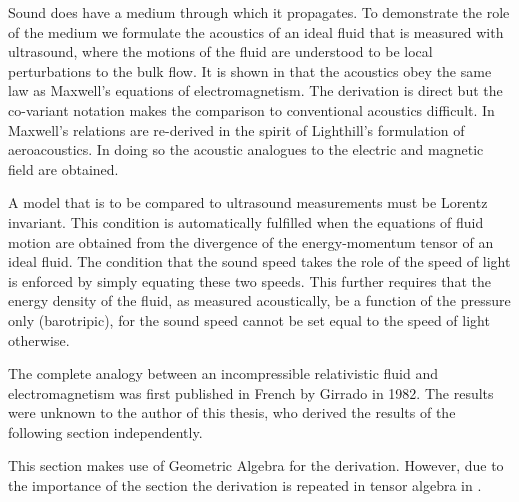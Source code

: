 Sound does have a medium through which it propagates.
To demonstrate the role of the medium we formulate the acoustics of  an ideal fluid that is measured with ultrasound,
where the motions of the fluid are  understood to be local perturbations to the bulk flow.
It is shown in  that the acoustics  obey the same law as Maxwell's equations of electromagnetism.
The derivation is direct but the co-variant notation makes the comparison to conventional acoustics difficult.
In  Maxwell's relations are re-derived in the spirit of Lighthill's formulation of aeroacoustics.
In doing so the acoustic analogues to the electric and magnetic field are obtained.

%
A model that is to be compared to ultrasound measurements must be  Lorentz invariant.
This condition is  automatically fulfilled  when the equations of fluid motion are obtained from the  divergence of the energy-momentum tensor of an ideal fluid.
The condition that the sound speed takes the role  of the speed of light
is enforced by simply equating these two speeds.
This further requires that the energy density of the fluid, as measured acoustically, be a function of the pressure only (barotripic),
for the sound speed cannot be set equal to the speed of light otherwise\cite{Taub1978}.

The complete analogy between an incompressible relativistic fluid and electromagnetism was first published in French by Girrado\cite{Girrado1982} in 1982.
The results were unknown to the author of this thesis, who derived the results of the following section independently.

This section makes use of Geometric Algebra for the derivation.
However, due to the importance of the section the derivation is repeated in tensor algebra in .

